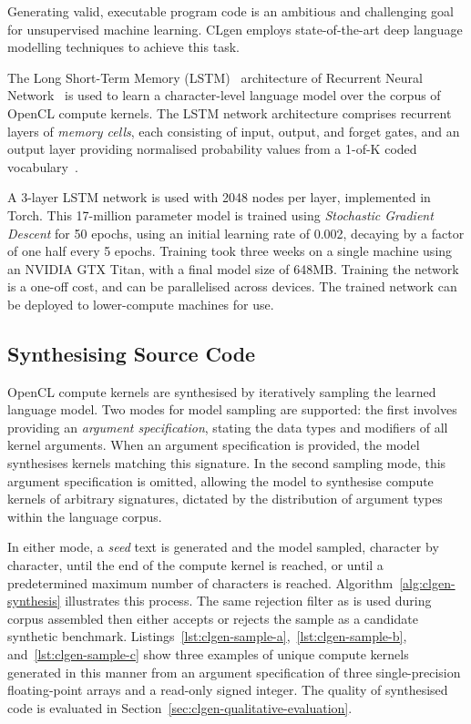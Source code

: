 Generating valid, executable program code is an ambitious and challenging goal for unsupervised machine learning. CLgen employs state-of-the-art deep language modelling techniques to achieve this task.

The Long Short-Term Memory (LSTM)~\cite{Hochreiter1997} architecture of Recurrent Neural Network~\cite{Sundermeyer2012,Mikolov2015} is used to learn a character-level language model over the corpus of OpenCL compute kernels. The LSTM network architecture comprises recurrent layers of \emph{memory cells}, each consisting of input, output, and forget gates, and an output layer providing normalised probability values from a 1-of-K coded vocabulary~\cite{Graves2005}.

A 3-layer LSTM network is used with 2048 nodes per layer, implemented in Torch. This 17-million parameter model is trained using \textit{Stochastic Gradient Descent} for 50 epochs, using an initial learning rate of 0.002, decaying by a factor of one half every 5 epochs. Training took three weeks on a single machine using an NVIDIA GTX Titan, with a final model size of 648MB. Training the network is a one-off cost, and can be parallelised across devices. The trained network can be deployed to lower-compute machines for use.

\subsection{Synthesising Source Code}
\label{subsec:synthesizing-opencl}

OpenCL compute kernels are synthesised by iteratively sampling the learned language model. Two modes for model sampling are supported: the first involves providing an \emph{argument specification}, stating the data types and modifiers of all kernel arguments. When an argument specification is provided, the model synthesises kernels matching this signature. In the second sampling mode, this argument specification is omitted, allowing the model to synthesise compute kernels of arbitrary signatures, dictated by the distribution of argument types within the language corpus.

In either mode, a \emph{seed} text is generated and the model sampled, character by character, until the end of the compute kernel is reached, or until a predetermined maximum number of characters is reached. Algorithm~\ref{alg:clgen-synthesis} illustrates this process. The same rejection filter as is used during corpus assembled then either accepts or rejects the sample as a candidate synthetic benchmark. Listings~\ref{lst:clgen-sample-a},~\ref{lst:clgen-sample-b}, and~\ref{lst:clgen-sample-c} show three examples of unique compute kernels generated in this manner from an argument specification of three single-precision floating-point arrays and a read-only signed integer. The quality of synthesised code is evaluated in Section~\ref{sec:clgen-qualitative-evaluation}.

